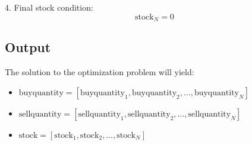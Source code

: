 \documentclass{article}
\begin{document}
4. Final stock condition:
\[
\text{stock}_N = 0
\]

\subsection*{Output}

The solution to the optimization problem will yield:
\begin{itemize}
    \item \( \text{buyquantity} = [\text{buyquantity}_1, \text{buyquantity}_2, \ldots, \text{buyquantity}_N] \)
    \item \( \text{sellquantity} = [\text{sellquantity}_1, \text{sellquantity}_2, \ldots, \text{sellquantity}_N] \)
    \item \( \text{stock} = [\text{stock}_1, \text{stock}_2, \ldots, \text{stock}_N] \)
\end{itemize}
\end{document}
